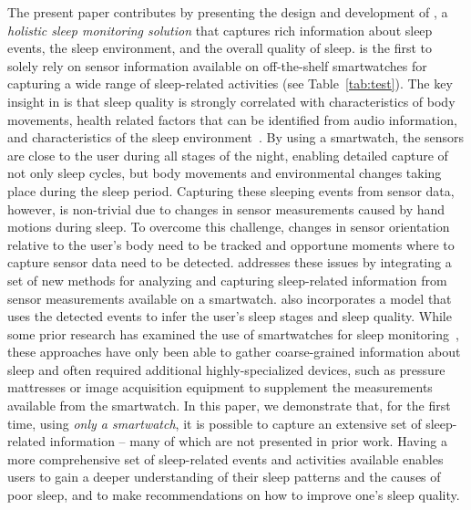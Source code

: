 The present paper contributes by presenting the design and development of {\systemname}, a \emph{holistic sleep monitoring solution} that captures rich information about sleep events, the sleep environment, and the overall quality of sleep. {\systemname} is the first to solely rely on sensor information available on off-the-shelf smartwatches for capturing a wide range of sleep-related activities (see Table~\ref{tab:test}). The key insight in {\systemname} is that sleep quality is strongly correlated with characteristics of body movements, health related factors that can be identified from audio information, and characteristics of the sleep environment~\cite{shelgikar2016sleep}. By using a smartwatch, the sensors are close to the user during all stages of the night, enabling detailed capture of not only sleep cycles, but body movements and environmental changes taking place during the sleep period. Capturing these sleeping events from sensor data, however, is non-trivial due to changes in sensor measurements caused by hand motions during sleep. To overcome this challenge, changes in sensor orientation relative to the user's body need to be tracked and opportune moments where to capture sensor data need to be detected.  {\systemname} addresses these issues by integrating a set of new methods for analyzing and capturing sleep-related information from sensor measurements available on a smartwatch. {\systemname} also incorporates a model that uses the detected events to infer the user's sleep stages and sleep quality. While some prior research has examined the use of smartwatches for sleep monitoring~\cite{pombo2016ubisleep,shelgikar2016sleep,haescher2015anomaly,borazio2012combining}, these approaches have only been able to gather coarse-grained information about sleep and often required additional highly-specialized devices, such as pressure mattresses or image acquisition equipment to supplement the measurements available from the smartwatch. In this paper, we demonstrate that, for the first time, using {\em only a smartwatch}, it is possible to capture an extensive set of sleep-related information -- many of which are not presented in prior work. Having a more comprehensive set of sleep-related events and activities available enables users to gain a deeper understanding of their sleep patterns and the causes of poor sleep, and to make recommendations on how to improve one's sleep quality.

